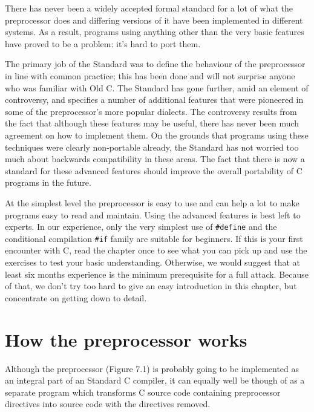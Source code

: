    There has never been a widely accepted formal standard for a lot of
   what the preprocessor does and differing versions of it have been
   implemented in different systems. As a result, programs using anything
   other than the very basic features have proved to be a problem:
   it's hard to port them.


   The primary job of the Standard was to define the behaviour of the
   preprocessor in line with common practice; this has been done and will
   not surprise anyone who was familiar with Old C. The Standard has gone
   further, amid an element of controversy, and specifies a number of
   additional features that were pioneered in some of the preprocessor's
   more popular dialects. The controversy results from the fact that
   although these features may be useful, there has never been much
   agreement on how to implement them. On the grounds that programs using
   these techniques were clearly non-portable already, the Standard has not
   worried too much about backwards compatibility in these areas. The fact
   that there is now a standard for these advanced features should improve
   the overall portability of C programs in the future.


   At the simplest level the preprocessor is easy to use and can help
   a lot to make programs easy to read and maintain. Using the advanced
   features is best left to experts. In our experience, only the very
   simplest use of \texttt{\#define} and the conditional compilation
   \texttt{\#if} family are suitable for beginners. If this is your first
   encounter with C, read the chapter once to see what you can pick up and
   use the exercises to test your basic understanding. Otherwise, we would
   suggest that at least six months experience is the minimum prerequisite
   for a full attack. Because of that, we don't try too hard to give an easy
   introduction in this chapter, but concentrate on getting down to
   detail.


 
        \section{How the preprocessor works}
        

  

  Although the preprocessor (Figure 7.1) is probably going
   to be implemented as an integral part of an Standard C compiler, it can
   equally well be though of as a separate program which transforms C source
   code containing preprocessor directives into source code with the
   directives removed.


